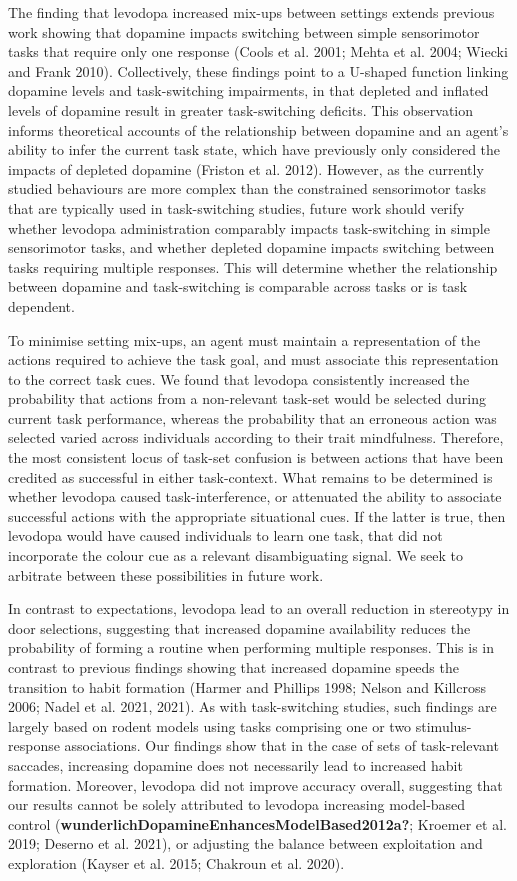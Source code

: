 \documentclass{article}
\begin{document}
The finding that levodopa increased mix-ups between settings extends
previous work showing that dopamine impacts switching between simple
sensorimotor tasks that require only one response (Cools et al. 2001;
Mehta et al. 2004; Wiecki and Frank 2010). Collectively, these findings
point to a U-shaped function linking dopamine levels and task-switching
impairments, in that depleted and inflated levels of dopamine result in
greater task-switching deficits. This observation informs theoretical
accounts of the relationship between dopamine and an agent's ability to
infer the current task state, which have previously only considered the
impacts of depleted dopamine (Friston et al. 2012). However, as the
currently studied behaviours are more complex than the constrained
sensorimotor tasks that are typically used in task-switching studies,
future work should verify whether levodopa administration comparably
impacts task-switching in simple sensorimotor tasks, and whether
depleted dopamine impacts switching between tasks requiring multiple
responses. This will determine whether the relationship between dopamine
and task-switching is comparable across tasks or is task dependent.

To minimise setting mix-ups, an agent must maintain a representation of
the actions required to achieve the task goal, and must associate this
representation to the correct task cues. We found that levodopa
consistently increased the probability that actions from a non-relevant
task-set would be selected during current task performance, whereas the
probability that an erroneous action was selected varied across
individuals according to their trait mindfulness. Therefore, the most
consistent locus of task-set confusion is between actions that have been
credited as successful in either task-context. What remains to be
determined is whether levodopa caused task-interference, or attenuated
the ability to associate successful actions with the appropriate
situational cues. If the latter is true, then levodopa would have caused
individuals to learn one task, that did not incorporate the colour cue
as a relevant disambiguating signal. We seek to arbitrate between these
possibilities in future work.

In contrast to expectations, levodopa lead to an overall reduction in
stereotypy in door selections, suggesting that increased dopamine
availability reduces the probability of forming a routine when
performing multiple responses. This is in contrast to previous findings
showing that increased dopamine speeds the transition to habit formation
(Harmer and Phillips 1998; Nelson and Killcross 2006; Nadel et al. 2021,
2021). As with task-switching studies, such findings are largely based
on rodent models using tasks comprising one or two stimulus-response
associations. Our findings show that in the case of sets of
task-relevant saccades, increasing dopamine does not necessarily lead to
increased habit formation. Moreover, levodopa did not improve accuracy
overall, suggesting that our results cannot be solely attributed to
levodopa increasing model-based control
(\textbf{wunderlichDopamineEnhancesModelBased2012a?}; Kroemer et al.
2019; Deserno et al. 2021), or adjusting the balance between
exploitation and exploration (Kayser et al. 2015; Chakroun et al. 2020).
\end{document}
